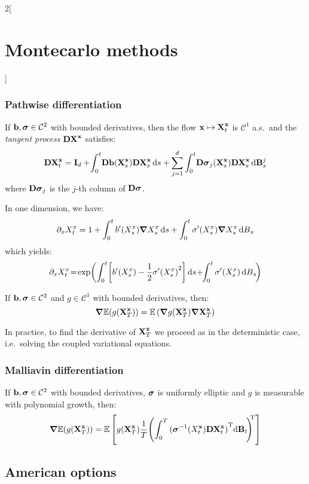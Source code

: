 \documentclass[../../../main_math.tex]{subfiles}
\begin{document}
\begin{multicols}{2}[\section{Montecarlo methods}]
  \subsubsection{Pathwise differentiation}
  \begin{theorem}
    If $\boldsymbol{\mathrm{b}},\boldsymbol{\mathrm{\sigma}}\in \mathcal{C}^2$ with bounded derivatives, then the flow ${\boldsymbol{\mathrm{x}}}\mapsto \boldsymbol{\mathrm{X}}_t^{\boldsymbol{\mathrm{x}}}$ is $\mathcal{C}^1$ a.s.\ and the \emph{tangent process} $\boldsymbol{\mathrm{DX}}^{\boldsymbol{\mathrm{x}}}$ satisfies:
    $$
      \boldsymbol{\mathrm{DX}}^{\boldsymbol{\mathrm{x}}}_t=\boldsymbol{\mathrm{I}}_d+\!\int_0^t\! \boldsymbol{\mathrm{Db}}(\boldsymbol{\mathrm{X}}_s^{\boldsymbol{\mathrm{x}}})\boldsymbol{\mathrm{DX}}_s^{\boldsymbol{\mathrm{x}}}\dd{s}+\sum_{j=1}^{d}\int_0^t\! \boldsymbol{\mathrm{D\sigma}}_j(\boldsymbol{\mathrm{X}}_s^{\boldsymbol{\mathrm{x}}})\boldsymbol{\mathrm{DX}}_s^{\boldsymbol{\mathrm{x}}}\dd{\boldsymbol{\mathrm{B}}_s^j}
    $$
    where $\boldsymbol{\mathrm{D\sigma}}_j$ is the $j$-th column of $\boldsymbol{\mathrm{D\sigma}}$.
  \end{theorem}
  \begin{remark}
    In one dimension, we have:
    $$
      \partial_xX_t^x=1+\int_0^t b'(X_s^x)\grad X_s^x\dd{s}+\int_0^t \sigma'(X_s^x)\grad X_s^x\dd{B}_s
    $$
    which yields:
    $$
      \partial_xX_t^x\!=\!\expp{\int_0^t\!\left[b'(X_s^x)-\frac{1}{2}{\sigma'(X_s^x)}^2\right]\dd{s} \!+\!\! \int_0^t \sigma'(X_s^x)\dd{B}_s\!}
    $$
  \end{remark}
  \begin{proposition}
    If $\boldsymbol{\mathrm{b}},\boldsymbol{\mathrm{\sigma}}\in \mathcal{C}^2$ and $g\in\mathcal{C}^1$ with bounded derivatives, then:
    $$
      \grad \mathbb{E}(g(\boldsymbol{\mathrm{X}}_T^{\boldsymbol{\mathrm{x}}}))=\mathbb{E}\left(\grad g(\boldsymbol{\mathrm{X}}_T^{\boldsymbol{\mathrm{x}}})\grad \boldsymbol{\mathrm{X}}_T^{\boldsymbol{\mathrm{x}}}\right)
    $$
  \end{proposition}
  \begin{remark}
    In practice, to find the derivative of $\boldsymbol{\mathrm{X}}_T^{\boldsymbol{\mathrm{x}}}$ we proceed as in the deterministic case, i.e.\ solving the coupled variational equations.
  \end{remark}
  \subsubsection{Malliavin differentiation}
  \begin{proposition}
    If $\boldsymbol{\mathrm{b}},\boldsymbol{\mathrm{\sigma}}\in \mathcal{C}^2$ with bounded derivatives, $\boldsymbol{\mathrm{\sigma}}$ is uniformly elliptic and $g$ is measurable with polynomial growth, then:
    $$
      \grad \mathbb{E}(g(\boldsymbol{\mathrm{X}}_T^{\boldsymbol{\mathrm{x}}}))=\mathbb{E}\left[g(\boldsymbol{\mathrm{X}}_T^{\boldsymbol{\mathrm{x}}})\frac{1}{T}{\left(\int_0^T{(\boldsymbol{\mathrm{\sigma}}^{-1}(X_t^{\boldsymbol{\mathrm{x}}})\boldsymbol{\mathrm{DX}}_t^{\boldsymbol{\mathrm{x}}})}^{\mathrm{T}}\!\dd{\boldsymbol{\mathrm{B}}_t}\!\right)\!\!}^{\mathrm{T}}\right]
    $$
  \end{proposition}
  \subsection{American options}
\end{multicols}
\end{document}
